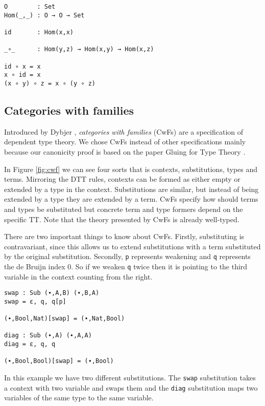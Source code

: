 \begin{verbatim}
O        : Set
Hom(_,_) : O → O → Set

id       : Hom(x,x)

_∘_      : Hom(y,z) → Hom(x,y) → Hom(x,z)

id ∘ x = x
x ∘ id = x
(x ∘ y) ∘ z = x ∘ (y ∘ z)
\end{verbatim}

\subsection{Categories with families}

Introduced by Dybjer \cite{dybjer1995internal}, \emph{categories with families} (CwFs) are a specification of dependent type theory. We chose CwFs instead of other specifications \cite{awodey2018natural, uemura2023general} mainly because our canonicity proof is based on the paper Gluing for Type Theory \cite{kaposi2019gluing}.



 In Figure \ref{fig:cwf} we can see four sorts that is contexts, substitutions, types and terms. Mirroring the DTT rules, contexts can be formed as either empty or extended by a type in the context. Substitutions are similar, but instead of being extended by a type they are extended by a term. CwFs specify how should terms and types be substituted but concrete term and type formers depend on the specific TT. Note that the theory presented by CwFs is already well-typed.

There are two important things to know about CwFs. Firstly, substituting is contravariant, since this allows us to extend substitutions with a term substituted by the original substitution. Secondly, \texttt{p} represents weakening and \texttt{q} represents the de Bruijn index 0. So if we weaken \texttt{q} twice then it is pointing to the third variable in the context counting from the right.

\begin{verbatim}
swap : Sub (∙,A,B) (∙,B,A)
swap = ε, q, q[p]

(∙,Bool,Nat)[swap] = (∙,Nat,Bool)

diag : Sub (∙,A) (∙,A,A)
diag = ε, q, q

(∙,Bool,Bool)[swap] = (∙,Bool)
\end{verbatim}

In this example we have two different substitutions. The \texttt{swap} substitution takes a context with two variable and swaps them and the \texttt{diag} substitution maps two variables of the same type to the same variable.

